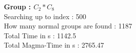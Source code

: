 \textbf{Group : $C_2*C_8$}\\
Searching up to index : 500\\
How many normal groups are found : 1187\\
Total Time in s : 1142.5\\
Total Magma-Time in s : 2765.47\\
